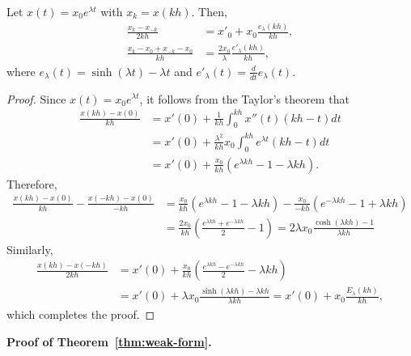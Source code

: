 \documentclass[final]{siamltex}
\begin{document}
\begin{appendices}
\begin{lemma} \label{lemma:Taylor}
    Let $x(t) = x_0e^{\lambda t}$ with $x_k = x(kh)$. Then,
    \begin{align*}
        \frac{x_k - x_{-k}}{2kh} &= x'_0 + x_0\frac{e_\lambda(kh)}{kh}, \\
        \frac{x_k -x_0 + x_{-k}-x_0}{kh} &=\frac{2x_0}{\lambda} \frac{e'_\lambda(kh)}{kh},
    \end{align*}
    where $e_\lambda(t) = \sinh(\lambda t) - \lambda t$
    and $e'_\lambda(t) = \frac{d}{dt}e_\lambda(t)$.
\end{lemma}
\begin{proof}
    Since $x(t) = x_0e^{\lambda t}$,
    it follows from the Taylor's theorem that 
    \begin{align*}
        \frac{x(kh) - x(0)}{kh} &= x'(0) + \frac{1}{kh}\int_0^{kh} x''(t) (kh-t) dt \\
        &= x'(0) + \frac{\lambda^2}{kh} x_0 \int_0^{kh}  e^{\lambda t} (kh-t) dt \\
        &= x'(0) + \frac{x_0}{kh}(e^{\lambda kh}-1-\lambda kh).
    \end{align*}
    Therefore,
    \begin{align*}
        \frac{x(kh) - x(0)}{kh} - \frac{x(-kh) - x(0)}{-kh}
        &= \frac{x_0}{kh}(e^{\lambda kh}-1-\lambda kh) - \frac{x_0}{-kh}(e^{-\lambda kh}-1+\lambda kh) \\
        &= \frac{2x_0}{kh}(\frac{e^{\lambda kh}+e^{-\lambda kh}}{2}-1)
        = 2\lambda x_0 \frac{\cosh(\lambda kh)-1}{\lambda kh} 
    \end{align*}
    Similarly, 
    \begin{align*}
        \frac{x(kh)-x(-kh)}{2kh} &= x'(0) + \frac{x_0}{kh}(\frac{e^{\lambda kh}-e^{-\lambda kh}}{2}-\lambda kh) \\
        &= x'(0) + \lambda x_0\frac{\sinh(\lambda kh) - \lambda kh}{\lambda kh} 
        = x'(0) + x_0 \frac{E_\lambda(kh)}{kh},
    \end{align*}
    which completes the proof.  
\end{proof}

\textbf{Proof of Theorem~\ref{thm:weak-form}.}


\end{appendices}
\end{document}
